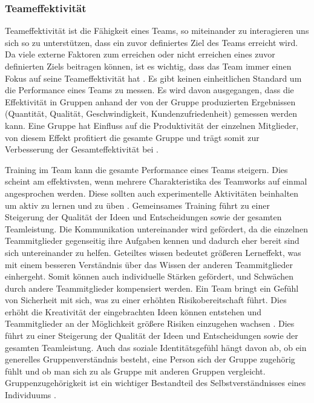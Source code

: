 \documentclass[a4paper,11pt]{article}%
\renewcommand{\\}{\vspace*{0.5\baselineskip} \newline}
\begin{document}
		\subsubsection{Teameffektivität}
\label{Teameffektivität}
Teameffektivität ist die Fähigkeit eines Teams, so miteinander zu interagieren uns sich so zu unterstützen, dass ein zuvor definiertes Ziel des Teams erreicht wird. Da viele externe Faktoren zum erreichen oder nicht erreichen eines zuvor definierten Ziels beitragen können, ist es wichtig, dass das Team immer einen Fokus auf seine Teameffektivität hat \citep[p.557]{salas2005there}.
	Es gibt keinen einheitlichen Standard um die Performance eines Teams zu messen. Es wird davon ausgegangen, dass die Effektivität in Gruppen anhand der von der Gruppe produzierten Ergebnissen (Quantität, Qualität, Geschwindigkeit, Kundenzufriedenheit) gemessen werden kann. Eine Gruppe hat Einfluss auf die Produktivität der einzelnen Mitglieder, von diesem Effekt profitiert die gesamte Gruppe und trägt somit zur Verbesserung der Gesamteffektivität bei \citep[p.309]{guzzo1996teams}.
	
Training im Team kann die gesamte Performance eines Teams steigern. Dies scheint am effektivsten, wenn mehrere Charakteristika des Teamworks auf einmal angesprochen werden. Diese sollten auch experimentelle Aktivitäten beinhalten um aktiv zu lernen und zu üben \citep[19]{mcewan2017effectiveness}.
Gemeinsames Training führt zu einer Steigerung der Qualität der Ideen und Entscheidungen sowie der gesamten Teamleistung.
Die Kommunikation untereinander wird gefördert, da die einzelnen Teammitglieder gegenseitig ihre Aufgaben kennen und dadurch eher bereit sind sich untereinander zu helfen.
Geteiltes wissen bedeutet größeren Lerneffekt, was mit einem besseren Verständnis über das Wissen der anderen Teammitglieder einhergeht. Somit können auch individuelle Stärken gefördert, und Schwächen durch andere Teammitglieder kompensiert werden.
Ein Team bringt ein Gefühl von Sicherheit mit sich, was zu einer erhöhten Risikobereitschaft führt. Dies erhöht die Kreativität der eingebrachten Ideen können entstehen und Teammitglieder an der Möglichkeit größere Risiken einzugehen wachsen \citep[p. 2-4]{biech2007pfeiffer}.
Dies führt zu einer Steigerung der Qualität der Ideen und Entscheidungen sowie der gesamten Teamleistung.
Auch das soziale Identitätsgefühl hängt davon ab, ob ein generelles Gruppenverständnis besteht, eine Person sich der Gruppe zugehörig fühlt und ob man sich zu als Gruppe mit anderen Gruppen vergleicht. Gruppenzugehörigkeit ist ein wichtiger Bestandteil des Selbstverständnisses eines Individuums \citep{sutantovicious}.
	
\end{document}
